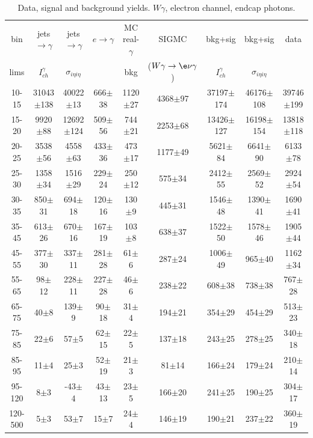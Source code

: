 \begin{table}[h]
  \tiny
  \begin{center}
  \caption{Data, signal and background yields. $W\gamma$, electron channel, endcap photons.}
  \begin{tabular}{|c|c|c|c|c|c|c|c|c|}
    bin & jets$\rightarrow\gamma$ & jets$\rightarrow\gamma$ & $e\rightarrow\gamma$ & MC real-$\gamma$ &  SIGMC & bkg+sig &  bkg+sig & data \\ 
    lims & $I_{ch}^{\gamma}$ & $\sigma_{i\eta i\eta}$ & & bkg & ($W\gamma\rightarrow\e\nu\gamma$) & $I_{ch}^{\gamma}$ &  $\sigma_{i\eta i\eta}$ &\\ \hline
 10-15 & 31043$\pm$138 & 40022$\pm$13 & 666$\pm$38 & 1120$\pm$27 & 4368$\pm$97 & 37197$\pm$174 & 46176$\pm$108 & 39746$\pm$199 \\ \hline 
15-20 & 9920$\pm$88 & 12692$\pm$124 & 509$\pm$56 & 744$\pm$21 & 2253$\pm$68 & 13426$\pm$127 & 16198$\pm$154 & 13818$\pm$118 \\ \hline 
20-25 & 3538$\pm$56 & 4558$\pm$63 & 433$\pm$36 & 473$\pm$17 & 1177$\pm$49 & 5621$\pm$84 & 6641$\pm$90 & 6133$\pm$78 \\ \hline 
25-30 & 1358$\pm$34 & 1516$\pm$29 & 229$\pm$24 & 250$\pm$12 & 575$\pm$34 & 2412$\pm$55 & 2569$\pm$52 & 2924$\pm$54 \\ \hline 
30-35 & 850$\pm$31 & 694$\pm$18 & 120$\pm$16 & 130$\pm$9 & 445$\pm$31 & 1546$\pm$48 & 1390$\pm$41 & 1690$\pm$41 \\ \hline 
35-45 & 613$\pm$26 & 670$\pm$16 & 167$\pm$19 & 103$\pm$8 & 638$\pm$37 & 1522$\pm$50 & 1578$\pm$46 & 1905$\pm$44 \\ \hline 
45-55 & 377$\pm$30 & 337$\pm$11 & 281$\pm$28 & 61$\pm$6 & 287$\pm$24 & 1006$\pm$49 & 965$\pm$40 & 1162$\pm$34 \\ \hline 
55-65 & 98$\pm$12 & 228$\pm$11 & 227$\pm$28 & 46$\pm$6 & 238$\pm$22 & 608$\pm$38 & 738$\pm$38 & 767$\pm$28 \\ \hline 
65-75 & 40$\pm$8 & 139$\pm$9 & 90$\pm$18 & 31$\pm$4 & 194$\pm$21 & 354$\pm$29 & 454$\pm$29 & 513$\pm$23 \\ \hline 
75-85 & 22$\pm$6 & 57$\pm$5 & 62$\pm$15 & 22$\pm$5 & 137$\pm$18 & 243$\pm$25 & 278$\pm$25 & 340$\pm$18 \\ \hline 
85-95 & 11$\pm$4 & 25$\pm$3 & 52$\pm$19 & 21$\pm$3 & 81$\pm$14 & 166$\pm$24 & 179$\pm$24 & 210$\pm$14 \\ \hline 
95-120 & 8$\pm$3 & -43$\pm$4 & 43$\pm$13 & 23$\pm$5 & 166$\pm$20 & 241$\pm$25 & 190$\pm$25 & 304$\pm$17 \\ \hline 
120-500 & 5$\pm$3 & 53$\pm$7 & 15$\pm$7 & 24$\pm$4 & 146$\pm$19 & 190$\pm$21 & 237$\pm$22 & 360$\pm$19 \\ \hline 
  \end{tabular}
  \label{tab:yields_Wg_to_enu__Endcap_}
  \end{center}
\end{table}
